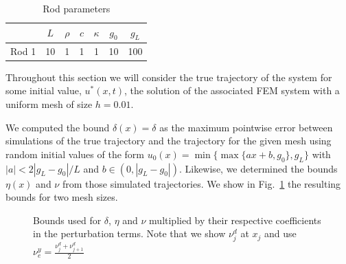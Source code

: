 \documentclass{article}
\begin{document}
\begin{table}
\centering
\begin{tabular}{|c|c|c|c|c|c|c|}
    \hline
    & $L$ & $\rho$ & $c$ & $\kappa$ & $g_0$ & $g_L$ \\
    \hline
    Rod 1 & 10 & 1 & 1 & 1 & 10 & 100 \\
    \hline
\end{tabular}
\caption{Rod parameters}
\label{tab:ex_pars}
\end{table}

Throughout this
section we will consider the true trajectory of the system for some initial
value, $u^*(x, t)$, the solution of the associated FEM system with a uniform mesh of
size $h = 0.01$.

We computed the bound $\delta(x) = \delta$ as the maximum pointwise
error between simulations of the true trajectory and the trajectory for the
given mesh using random initial values of the form $u_0(x) = \min\{\max\{a x +
b, g_0\}, g_L\}$ with $|a| < 2 |g_L - g_0| / L$ and $b \in (0, |g_L - g_0|)$.
Likewise, we determined the bounds $\eta(x)$ and $\nu$ from those simulated
trajectories. We show in Fig.~\ref{fig:bounds} the resulting bounds for two mesh
sizes.

\begin{figure}[!t]
    \centering 
        \hfill
        \hfill
    \caption{Bounds used for $\delta$, $\eta$ and $\nu$ multiplied by their
    respective coefficients in the perturbation terms. Note that we show $\nu^d_j$ at
    $x_j$ and use $\nu_e^y = \frac{\nu^d_j + \nu^d_{j+1}}{2}$}
    \label{fig:bounds}
\end{figure}
\end{document}

